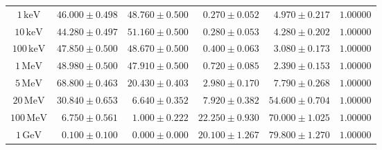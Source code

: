 \begin{tabular}{crrrrr}
\midrule
$1\,\mathrm{keV}$ & $46.000\pm0.498$ & $48.760\pm0.500$ & $0.270\pm0.052$ & $4.970\pm0.217$ & $1.00000$ \\
$10\,\mathrm{keV}$ & $44.280\pm0.497$ & $51.160\pm0.500$ & $0.280\pm0.053$ & $4.280\pm0.202$ & $1.00000$ \\
$100\,\mathrm{keV}$ & $47.850\pm0.500$ & $48.670\pm0.500$ & $0.400\pm0.063$ & $3.080\pm0.173$ & $1.00000$ \\
$1\,\mathrm{MeV}$ & $48.980\pm0.500$ & $47.910\pm0.500$ & $0.720\pm0.085$ & $2.390\pm0.153$ & $1.00000$ \\
$5\,\mathrm{MeV}$ & $68.800\pm0.463$ & $20.430\pm0.403$ & $2.980\pm0.170$ & $7.790\pm0.268$ & $1.00000$ \\
$20\,\mathrm{MeV}$ & $30.840\pm0.653$ & $6.640\pm0.352$ & $7.920\pm0.382$ & $54.600\pm0.704$ & $1.00000$ \\
$100\,\mathrm{MeV}$ & $6.750\pm0.561$ & $1.000\pm0.222$ & $22.250\pm0.930$ & $70.000\pm1.025$ & $1.00000$ \\
$1\,\mathrm{GeV}$ & $0.100\pm0.100$ & $0.000\pm0.000$ & $20.100\pm1.267$ & $79.800\pm1.270$ & $1.00000$ \\
\bottomrule
\end{tabular}
